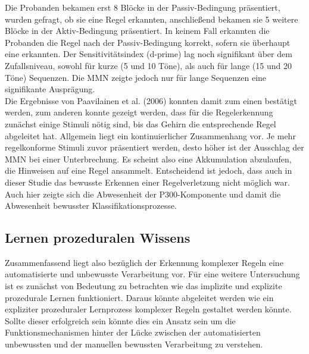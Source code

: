 \documentclass[doc,a4paper,12pt]{apa6}
\begin{document}
Die Probanden bekamen erst 8 Blöcke in der Passiv-Bedingung präsentiert, wurden gefragt, ob sie eine Regel erkannten, anschließend bekamen sie 5 weitere Blöcke in der Aktiv-Bedingung präsentiert. In keinem Fall erkannten die Probanden die Regel nach der Passiv-Bedingung korrekt, sofern sie überhaupt eine erkannten. Der Sensitivitätsindex (d-prime) lag noch signifikant über dem Zufallsniveau, sowohl für kurze (5 und 10 Töne), als auch für lange (15 und 20 Töne) Sequenzen. Die MMN zeigte jedoch nur für lange Sequenzen eine signifikante Ausprägung.\\
Die Ergebnisse von Paavilainen et al. (2006) konnten damit zum einen bestätigt werden, zum anderen konnte gezeigt werden, dass für die Regelerkennung zunächst einige Stimuli nötig sind, bis das Gehirn die entsprechende Regel abgeleitet hat. Allgemein liegt ein kontinuierlicher Zusammenhang vor. Je mehr regelkonforme Stimuli zuvor präsentiert werden, desto höher ist der Ausschlag der MMN bei einer Unterbrechung. Es scheint also eine Akkumulation abzulaufen, die Hinweisen auf eine Regel ansammelt. Entscheidend ist jedoch, dass auch in dieser Studie das bewusste Erkennen einer Regelverletzung nicht möglich war. Auch hier zeigte sich die Abwesenheit der P300-Komponente und damit die Abwesenheit bewusster Klassifikationsprozesse.


\subsection{Lernen prozeduralen Wissens}

Zusammenfassend liegt also bezüglich der Erkennung komplexer Regeln eine automatisierte und unbewusste Verarbeitung vor. Für eine weitere Untersuchung ist es zunächst von Bedeutung zu betrachten wie das implizite und explizite prozedurale Lernen funktioniert. Daraus könnte abgeleitet werden wie ein expliziter prozeduraler Lernprozess komplexer Regeln gestaltet werden könnte. Sollte dieser erfolgreich sein könnte dies ein Ansatz sein um die Funktionsmechanismen hinter der Lücke zwischen der automatisierten unbewussten und der manuellen bewussten Verarbeitung zu verstehen.
\end{document}
